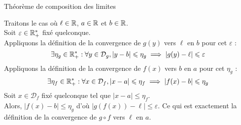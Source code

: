 \documentclass{article}
\date{20 Janvier 2024}
\begin{document}
\maketitle

\begin{question_kholle}
	{Théorème de composition des limites}

	Traitons le cas où $\ell \in \mathbb R$, $a \in \mathbb R$ et $b \in \mathbb R$. \\
	Soit $\varepsilon \in \mathbb R_+^*$ fixé quelconque. \\
	Appliquons la définition de la convergence de $g(y)$ vers $\ell$ en $b$ pour cet $\varepsilon$ :
	\begin{equation*}
		\exists \eta_g \in \mathbb R_+^* : \forall y \in \mathcal{D}_g, | y - b | \leqslant \eta_g \implies | g(y) - \ell | \leqslant \varepsilon
	\end{equation*}
	Appliquons la définition de la convergence de $f(x)$ vers $b$ en $a$ pour cet $\eta_g$ :
	\begin{equation*}
		\exists \eta_f \in \mathbb R_+^* : \forall x \in \mathcal{D}_f, | x - a | \leqslant \eta_f \implies | f(x) - b | \leqslant \eta_g
	\end{equation*}
	Soit $x \in \mathcal{D}_{f}$ fixé quelconque tel que $ | x - a | \leqslant \eta_{f} $.\\
	Alors, $ | f(x) - b | \leqslant \eta_g $ d'où $ | g(f(x)) - \ell | \leqslant \varepsilon $. Ce qui est exactement la définition de la convergence de $g\circ f$ vers $\ell$ en $a$.
\end{question_kholle}
\end{document}
